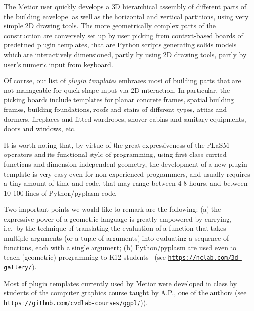 The Metior user quickly develops a 3D hierarchical assembly of different parts of the building envelope, as well as the horizontal and vertical partitions, using very simple 2D drawing tools. The more geometrically complex parts of the construction are conversely set up by user picking from context-based boards of predefined plugin templates, that are Python scripts generating solids models which are interactively dimensioned, partly by using 2D drawing tools, partly by user's numeric input from keyboard. 

Of course, our list of \emph{plugin templates} embraces most of building parts that are not manageable for quick shape input via 2D interaction. In particular, the picking boards include templates for planar concrete frames, spatial building frames, building foundations, roofs and stairs of different types, attics and dormers, fireplaces and fitted wardrobes, shover cabins and sanitary equipments, doors and windows, etc.

It is worth noting that, by virtue of the great expressiveness of the PLaSM operators and its functional style of programming, using first-class curried functions and dimension-independent geometry, the development of a new plugin template is very easy even for non-experienced programmers, and usually requires a tiny amount of time and code, that may range between 4-8 hours, and between 10-100 lines of Python/pyplasm code. 

Two important points we would like to remark are the following: (a) the expressive power of a geometric language is greatly empowered by  currying, i.e.~by the technique of translating the evaluation of a function that takes multiple arguments (or a tuple of arguments) into evaluating a sequence of functions, each with a single argument; (b) Python/pyplasm are used even to teach (geometric) programming to K12 students~\cite{ncLab} (see \href{https://nclab.com/3d-gallery/}{\texttt{https://nclab.com/3d-gallery/}}). 

Most of plugin templates currently used by Metior were developed in class by students of the computer  graphics course taught by A.P., one of the authors (see \href{https://github.com/cvdlab-courses/ggpl/blob/master/slides.md}{\texttt{https://github.com/cvdlab-courses/ggpl/}})). 


